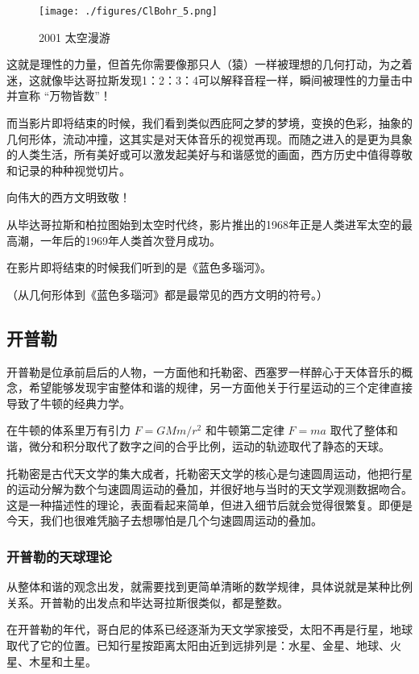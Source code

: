 \begin{figure}[ht]
\centering
\texttt{[image: ./figures/ClBohr\_5.png]}
\caption{2001 太空漫游} \label{ClBohr_fig5}
\end{figure}


这就是理性的力量，但首先你需要像那只人（猿）一样被理想的几何打动，为之着迷，这就像毕达哥拉斯发现1：2：3：4可以解释音程一样，瞬间被理性的力量击中并宣称 “万物皆数”！

而当影片即将结束的时候，我们看到类似西庇阿之梦的梦境，变换的色彩，抽象的几何形体，流动冲撞，这其实是对天体音乐的视觉再现。而随之进入的是更为具象的人类生活，所有美好或可以激发起美好与和谐感觉的画面，西方历史中值得尊敬和记录的种种视觉切片。

向伟大的西方文明致敬！

从毕达哥拉斯和柏拉图始到太空时代终，影片推出的1968年正是人类进军太空的最高潮，一年后的1969年人类首次登月成功。

在影片即将结束的时候我们听到的是《蓝色多瑙河》。

（从几何形体到《蓝色多瑙河》都是最常见的西方文明的符号。）


\subsection{开普勒}

开普勒是位承前启后的人物，一方面他和托勒密、西塞罗一样醉心于天体音乐的概念，希望能够发现宇宙整体和谐的规律，另一方面他关于行星运动的三个定律直接导致了牛顿的经典力学。

在牛顿的体系里万有引力 $F = G M m /r^2$ 和牛顿第二定律 $F = ma$ 取代了整体和谐，微分和积分取代了数字之间的合乎比例，运动的轨迹取代了静态的天球。

托勒密是古代天文学的集大成者，托勒密天文学的核心是匀速圆周运动，他把行星的运动分解为数个匀速圆周运动的叠加，并很好地与当时的天文学观测数据吻合。这是一种描述性的理论，表面看起来简单，但进入细节后就会觉得很繁复。即便是今天，我们也很难凭脑子去想哪怕是几个匀速圆周运动的叠加。

\subsubsection{开普勒的天球理论}

从整体和谐的观念出发，就需要找到更简单清晰的数学规律，具体说就是某种比例关系。开普勒的出发点和毕达哥拉斯很类似，都是整数。

在开普勒的年代，哥白尼的体系已经逐渐为天文学家接受，太阳不再是行星，地球取代了它的位置。已知行星按距离太阳由近到远排列是：水星、金星、地球、火星、木星和土星。

